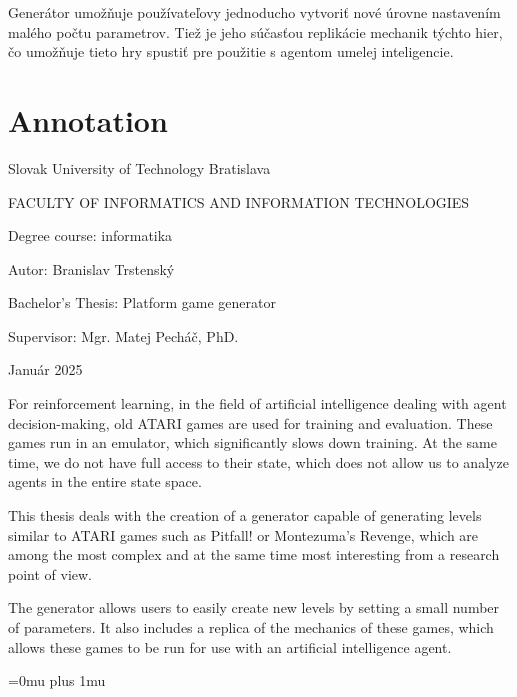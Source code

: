 \documentclass[11pt,slovak,a4paper]{article}
\begin{document}
Generátor umožňuje používateľovy jednoducho vytvoriť nové úrovne nastavením malého počtu parametrov. Tiež je jeho súčasťou replikácie mechanik týchto hier, čo umožňuje tieto hry spustiť pre použitie s agentom umelej inteligencie. 

\newpage

\null \thispagestyle{empty}

\newpage

\section*{Annotation}

Slovak University of Technology Bratislava

FACULTY OF INFORMATICS AND INFORMATION TECHNOLOGIES


Degree course: \tab informatika

Autor: \tab Branislav Trstenský

Bachelor's Thesis: \tab Platform game generator

Supervisor: \tab Mgr. Matej Pecháč, PhD.

Január 2025

For reinforcement learning, in the field of artificial intelligence dealing with agent decision-making, old ATARI games are used for training and evaluation. These games run in an emulator, which significantly slows down training. At the same time, we do not have full access to their state, which does not allow us to analyze agents in the entire state space.

This thesis deals with the creation of a generator capable of generating levels similar to ATARI games such as Pitfall! or Montezuma's Revenge, which are among the most complex and at the same time most interesting from a research point of view.

The generator allows users to easily create new levels by setting a small number of parameters. It also includes a replica of the mechanics of these games, which allows these games to be run for use with an artificial intelligence agent.

\newpage

\null \thispagestyle{empty}

\newpage

\thispagestyle{plain}
\tableofcontents

\newpage

\null \thispagestyle{empty}

\newpage

\setcounter{page}{1}



\newpage

\Urlmuskip=0mu plus 1mu
\def\UrlBreaks{\do\/\do-}



\end{document}
